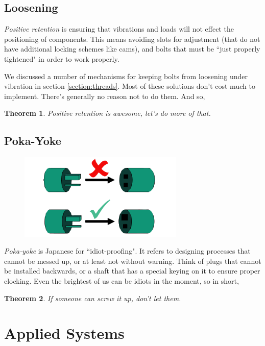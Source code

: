 \documentclass[10pt,letterpaper]{book}
\newtheorem{theorem}{Theorem}
\begin{document}
\section{Loosening}

\textit{Positive retention} is ensuring that vibrations and loads will not effect the positioning of components. This means avoiding slots for adjustment (that do not have additional locking schemes like cams), and bolts that must be ``just properly tightened" in order to work properly.

We discussed a number of mechanisms for keeping bolts from loosening under vibration in section \ref{section:threads}. Most of these solutions don't cost much to implement. There's generally no reason not to do them. And so,

\begin{theorem}
Positive retention is awesome, let's do more of that.
\end{theorem}

\section{Poka-Yoke}

\begin{figure}[H]
	\includegraphics[width=0.7\textwidth]{imgs/poka_yoke.png}
\end{figure}

\textit{Poka-yoke} is Japanese for ``idiot-proofing". It refers to designing processes that cannot be messed up, or at least not without warning. Think of plugs that cannot be installed backwards, or a shaft that has a special keying on it to ensure proper clocking. Even the brightest of us can be idiots in the moment, so in short,

\begin{theorem}
If someone can screw it up, don't let them.
\end{theorem}

\chapter{Applied Systems}
\end{document}
